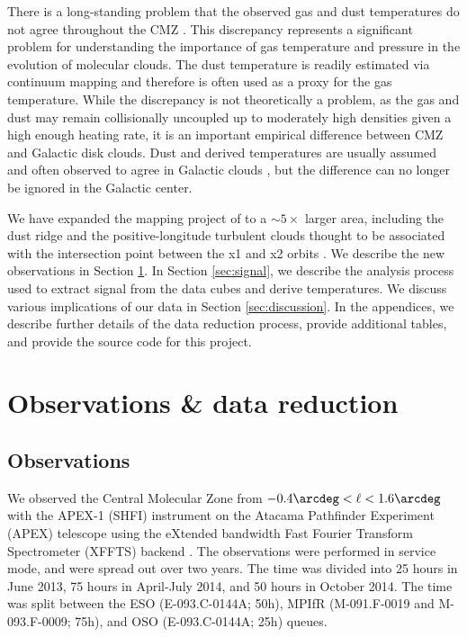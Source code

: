 There is a long-standing problem that the observed gas and dust temperatures do
not agree throughout the CMZ
\citep{Guesten1981a,Molinari2011a,Ao2013a,Ott2014a}.  This discrepancy
represents a significant problem for understanding the importance of gas
temperature and pressure in the evolution of molecular clouds.  The dust
temperature is readily estimated via continuum mapping and therefore is often
used as a proxy for the gas temperature.  While the discrepancy is not
theoretically a problem, as the gas and dust may remain collisionally uncoupled
up to moderately high densities given a high enough heating rate, it is an
important empirical difference between CMZ and Galactic disk clouds.
Dust and \ammonia derived temperatures are usually assumed and often observed
to agree in Galactic clouds
\citep{Pillai2006a,Dunham2010a,Juvela2012a,Battersby2014a}, but the difference
can no longer be ignored in the Galactic center.

We have expanded the \formaldehyde mapping project of \citet{Ao2013a} to a
$\sim5\times$ larger area, including the dust ridge and the positive-longitude
turbulent clouds thought to be associated with the intersection point between
the x1 and x2 orbits \citep{Rodriguez-Fernandez2006b,Riquelme2013a}.  We
describe the new
observations in Section \ref{sec:observations}.  In Section \ref{sec:signal},
we describe the analysis process used to extract signal from the data cubes and
derive temperatures.  We discuss various implications of our data in Section
\ref{sec:discussion}.  In the appendices, we describe further details of the
data reduction process, provide additional tables, and provide the source code
for this project.


\section{Observations \& data reduction}
\label{sec:observations}

\subsection{Observations}
We observed the Central Molecular Zone from $-0.4\arcdeg < \ell < 1.6\arcdeg$
with the APEX-1 (SHFI) instrument \citep{Vassilev2008a} on the Atacama Pathfinder
Experiment (APEX) telescope \citep{Guesten2006b} using the eXtended bandwidth
Fast Fourier Transform
Spectrometer (XFFTS) backend \citep{Klein2012a}.  The observations were
performed in service mode, and were spread out over two years.  The time was
divided into 25 hours in June
2013, 75 hours in April-July 2014, and 50 hours in October 2014.  The time was
split between the ESO (E-093.C-0144A; 50h), MPIfR (M-091.F-0019 and
M-093.F-0009; 75h), and OSO (E-093.C-0144A; 25h) queues.

